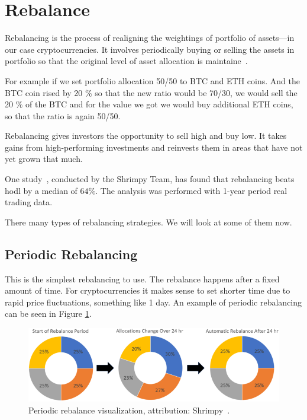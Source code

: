 \section{Rebalance}
\label{section-rebalance}
Rebalancing is the process of realigning the weightings of portfolio of assets---in our case cryptocurrencies. It involves periodically buying or selling the assets in portfolio so that the original level of asset allocation is maintaine~\cite{investopedia-rebalancing}.

For example if we set portfolio allocation 50/50 to BTC and ETH coins. And the BTC coin rised by 20 \% so that the new ratio would be 70/30, we would sell the 20 \% of the BTC and for the value we got we would buy additional ETH coins, so that the ratio is again 50/50.

Rebalancing gives investors the opportunity to sell high and buy low. It takes gains from high-performing investments and reinvests them in areas that have not yet grown that much.

One study~\cite{portfolio-rebalancing}, conducted by the Shrimpy Team, has found that rebalancing beats hodl by a median of $64\%$. The analysis was performed with 1-year period real trading data.

There many types of rebalancing strategies. We will look at some of them now.

\subsection*{Periodic Rebalancing}
This is the simplest rebalancing to use. The rebalance happens after a fixed amount of time. For cryptocurrencies it makes sense to set shorter time due to rapid price fluctuations, something like 1 day. An example of periodic rebalancing can be seen in Figure \ref{periodic-rebalance-figure}.

\begin{figure}[!hbt]
    \centering
    \includegraphics[width=\columnwidth]{figures/periodic-rebalance.png}
    \caption{Periodic rebalance visualization, attribution: Shrimpy~\cite{portfolio-rebalancing}.}
    \label{periodic-rebalance-figure}
\end{figure}


